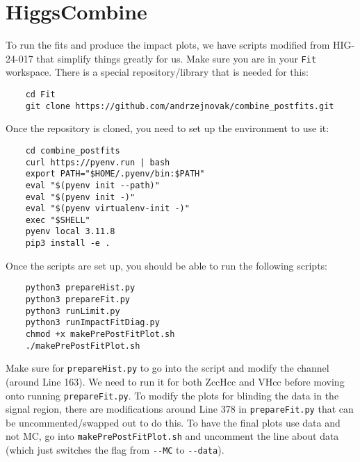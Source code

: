 \section{HiggsCombine}

To run the fits and produce the impact plots, we have scripts modified from HIG-24-017 that simplify things greatly for us. Make sure you are in your \verb|Fit| workspace. There is a special repository/library that is needed for this:

\begin{verbatim}
    cd Fit
    git clone https://github.com/andrzejnovak/combine_postfits.git
\end{verbatim}

\noindent Once the repository is cloned, you need to set up the environment to use it:

\begin{verbatim}
    cd combine_postfits
    curl https://pyenv.run | bash 
    export PATH="$HOME/.pyenv/bin:$PATH"
    eval "$(pyenv init --path)"
    eval "$(pyenv init -)"
    eval "$(pyenv virtualenv-init -)"
    exec "$SHELL"
    pyenv local 3.11.8
    pip3 install -e .
\end{verbatim}

\noindent Once the scripts are set up, you should be able to run the following scripts:

\begin{verbatim}
    python3 prepareHist.py
    python3 prepareFit.py
    python3 runLimit.py
    python3 runImpactFitDiag.py
    chmod +x makePrePostFitPlot.sh
    ./makePrePostFitPlot.sh
\end{verbatim}

\noindent Make sure for \verb|prepareHist.py| to go into the script and modify the channel (around Line 163). We need to run it for both ZccHcc and VHcc before moving onto running \verb|prepareFit.py|. To modify the plots for blinding the data in the signal region, there are modifications around Line 378 in \verb|prepareFit.py| that can be uncommented/swapped out to do this. To have the final plots use data and not MC, go into \verb|makePrePostFitPlot.sh| and uncomment the line about data (which just switches the flag from \verb|--MC| to \verb|--data|).